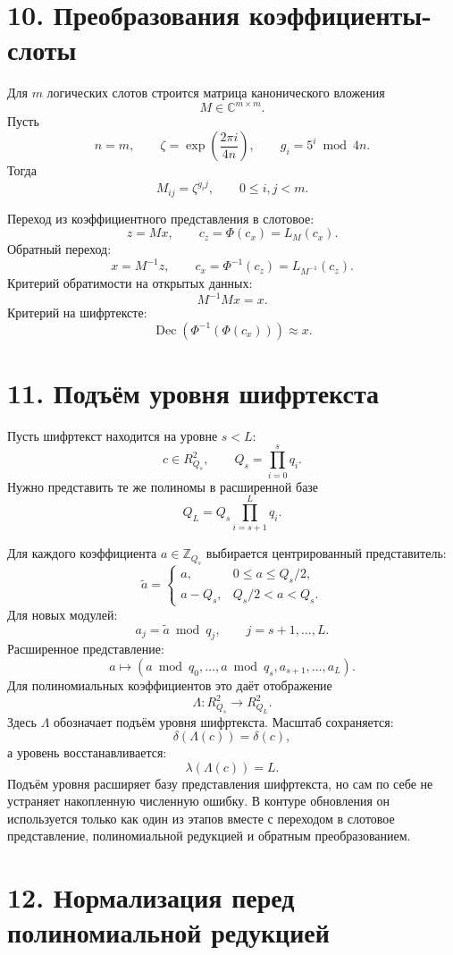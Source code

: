 \documentclass[12pt]{article}
\newcommand{\Dec}{\operatorname{Dec}}
\newcommand{\Lift}{\Lambda}
\newcommand{\CtoS}{\Phi}
\newcommand{\StoC}{\Phi^{-1}}
\newcommand{\lvl}{\lambda}
\newcommand{\scl}{\delta}
\begin{document}
\section*{10. Преобразования коэффициенты-слоты}

Для \(m\) логических слотов строится матрица канонического вложения
\[
    M\in\mathbb{C}^{m\times m}.
\]
Пусть
\[
    n=m,\qquad
    \zeta=\exp\left(\frac{2\pi i}{4n}\right),
    \qquad
    g_i=5^i\bmod 4n.
\]
Тогда
\[
    M_{ij}=\zeta^{g_i j},
    \qquad
    0\leq i,j<m.
\]

Переход из коэффициентного представления в слотовое:
\[
    z=Mx,
    \qquad
    c_z=\CtoS(c_x)=L_M(c_x).
\]
Обратный переход:
\[
    x=M^{-1}z,
    \qquad
    c_x=\StoC(c_z)=L_{M^{-1}}(c_z).
\]
Критерий обратимости на открытых данных:
\[
    M^{-1}Mx=x.
\]
Критерий на шифртексте:
\[
    \Dec\left(\StoC(\CtoS(c_x))\right)\approx x.
\]

\section*{11. Подъём уровня шифртекста}

Пусть шифртекст находится на уровне \(s<L\):
\[
    c\in R_{Q_s}^{2},
    \qquad
    Q_s=\prod_{i=0}^{s}q_i.
\]
Нужно представить те же полиномы в расширенной базе
\[
    Q_L=Q_s\prod_{i=s+1}^{L}q_i.
\]

Для каждого коэффициента \(a\in\mathbb{Z}_{Q_s}\) выбирается центрированный
представитель:
\[
    \tilde{a}=
    \begin{cases}
        a,&0\leq a\leq Q_s/2,\\
        a-Q_s,&Q_s/2<a<Q_s.
    \end{cases}
\]
Для новых модулей:
\[
    a_j=\tilde{a}\bmod q_j,
    \qquad
    j=s+1,\ldots,L.
\]
Расширенное представление:
\[
    a\mapsto
    (a\bmod q_0,\ldots,a\bmod q_s,a_{s+1},\ldots,a_L).
\]
Для полиномиальных коэффициентов это даёт отображение
\[
    \Lift:R_{Q_s}^{2}\rightarrow R_{Q_L}^{2}.
\]
Здесь \(\Lambda\) обозначает подъём уровня шифртекста.
Масштаб сохраняется:
\[
    \scl(\Lift(c))=\scl(c),
\]
а уровень восстанавливается:
\[
    \lvl(\Lift(c))=L.
\]
Подъём уровня расширяет базу представления шифртекста, но сам по себе не
устраняет накопленную численную ошибку. В контуре обновления он используется
только как один из этапов вместе с переходом в слотовое представление,
полиномиальной редукцией и обратным преобразованием.

\section*{12. Нормализация перед полиномиальной редукцией}
\end{document}
